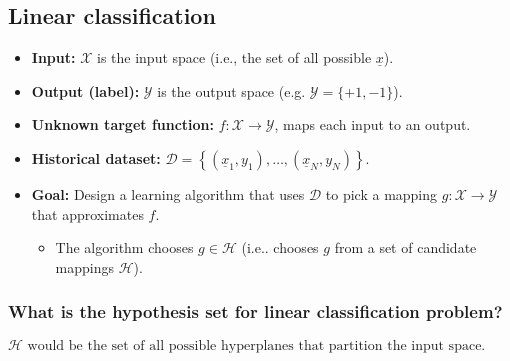 \subsection{Linear classification}
\begin{definition}
    \begin{itemize}
        \item \textbf{Input:} $\mathcal{X}$ is the input space (i.e., the set of all possible $\underline{x}$).
        \item \textbf{Output (label):} $\mathcal{Y}$ is the output space (e.g. $\mathcal{Y} = \{+1,-1\}$).
        \item \textbf{Unknown target function:} $f: \mathcal{X} \rightarrow \mathcal{Y}$, maps each input to an output.
        \item \textbf{Historical dataset:} $\mathcal{D} = \left\{ (\underline{x}_1, y_1), \dots, (\underline{x}_N, y_N) \right\}$.
        \item \textbf{Goal:} Design a learning algorithm that uses $\mathcal{D}$ to pick a mapping $g: \mathcal{X} \to \mathcal{Y}$ that approximates $f$.
        \begin{itemize}
            \item The algorithm chooses $g \in \mathcal{H}$ (i.e.. chooses $g$ from a set of candidate mappings $\mathcal{H}$).
        \end{itemize}
    \end{itemize}
\end{definition}

    \subsubsection{What is the hypothesis set for linear classification problem?}
    \begin{example}
        $\mathcal{H} \text{ would be the set of all possible hyperplanes that partition the input space.}$
    \end{example}

